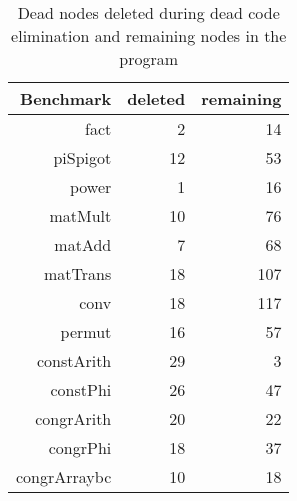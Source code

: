 \begin{table}[H]
\centering
\begin{tabular}{r r r}
\toprule
Benchmark & deleted & remaining \\
\midrule
fact	 & 	2	 & 	14	 \\
piSpigot	 & 	12	 & 	53	 \\
power	 & 	1	 & 	16	 \\
matMult	 & 	10	 & 	76	 \\
matAdd	 & 	7	 & 	68	 \\
matTrans	 & 	18	 & 	107	 \\
conv	 & 	18	 & 	117	 \\
permut	 & 	16	 & 	57	 \\
constArith	 & 	29	 & 	3	 \\
constPhi	 & 	26	 & 	47	 \\
congrArith	 & 	20	 & 	22	 \\
congrPhi	 & 	18	 & 	37	 \\
congrArraybc	 & 	10	 & 	18	 \\
\bottomrule
\end{tabular}
\caption{Dead nodes deleted during dead code elimination and remaining nodes in the program}
\label{tab:evaluation:dead-code-elimination}
\end{table}